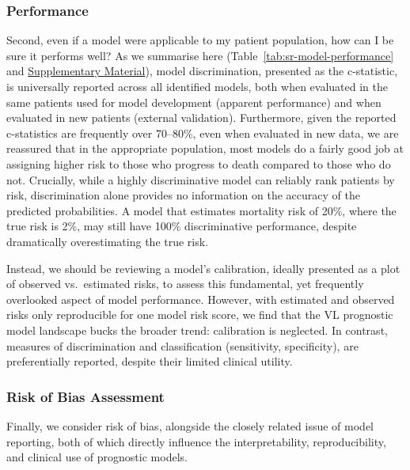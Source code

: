 \subsubsection{Performance}

Second, even if a model were applicable to my patient population, how can I be sure it performs well? As we summarise here (Table~\ref{tab:sr-model-performance} and \href{https://github.com/jpwil/dphil}{Supplementary Material}), model discrimination, presented as the c-statistic, is universally reported across all identified models, both when evaluated in the same patients used for model development (apparent performance) and when evaluated in new patients (external validation). Furthermore, given the reported c-statistics are frequently over 70--80\%, even when evaluated in new data, we are reassured that in the appropriate population, most models do a fairly good job at assigning higher risk to those who progress to death compared to those who do not. Crucially, while a highly discriminative model can reliably rank patients by risk, discrimination alone provides no information on the accuracy of the predicted probabilities. A model that estimates  mortality risk of 20\%, where the true  risk is 2\%, may still have 100\% discriminative performance, despite dramatically overestimating the true risk.

Instead, we should be reviewing a model's calibration, ideally presented as a plot of observed vs.\ estimated risks, to assess this fundamental, yet frequently overlooked aspect of model performance\cite{vancalster2019}. However, with estimated and observed risks only reproducible for one model risk score\cite{coura-vitalPrognosticFactorsScoring2014}, we find that the VL prognostic model landscape bucks the broader trend: calibration is neglected\cite{wynants2020,collinsExternalValidationMultivariable2014,bouwmeesterReportingMethodsClinical2012}. In contrast, measures of discrimination and classification (sensitivity, specificity), are preferentially reported, despite their limited clinical utility\cite{moons2019}.

\subsubsection{Risk of Bias Assessment}

Finally, we consider risk of bias, alongside the closely related issue of model reporting, both of which directly influence the interpretability, reproducibility, and clinical use of prognostic models.

